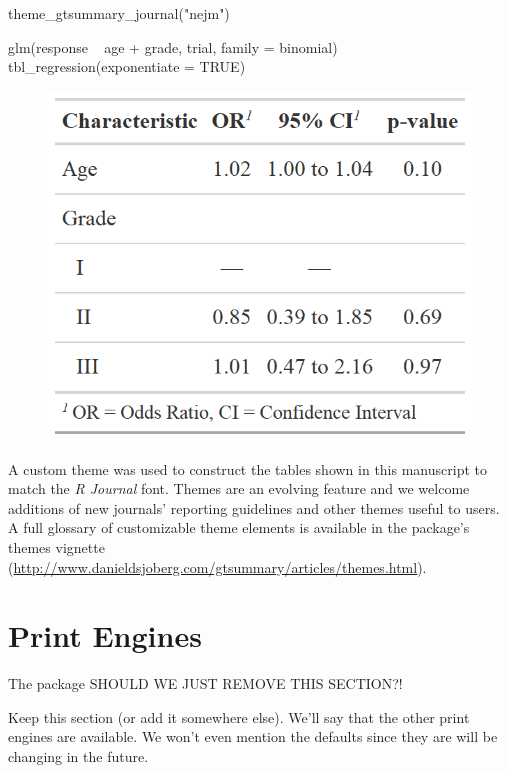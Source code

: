 \begin{example}
theme_gtsummary_journal("nejm")

glm(response ~ age + grade, trial, family = binomial) %
  tbl_regression(exponentiate = TRUE)
\end{example}

\begin{figure}[h!]
  \includegraphics[scale=0.28]{nejm.png}
  \centering
\end{figure}

A custom theme was used to construct the  tables shown in this manuscript to match the \emph{R Journal} font. 
Themes are an evolving feature and we welcome additions of new journals' reporting guidelines and other themes useful to users.
A full glossary of customizable theme elements is available in the package's themes vignette (\url{http://www.danieldsjoberg.com/gtsummary/articles/themes.html}).

\section{Print Engines}

The  package 
SHOULD WE JUST REMOVE THIS SECTION?!

Keep this section (or add it somewhere else).  We'll say that the other print engines are available. We won't even mention the defaults since they are will be changing in the future.

